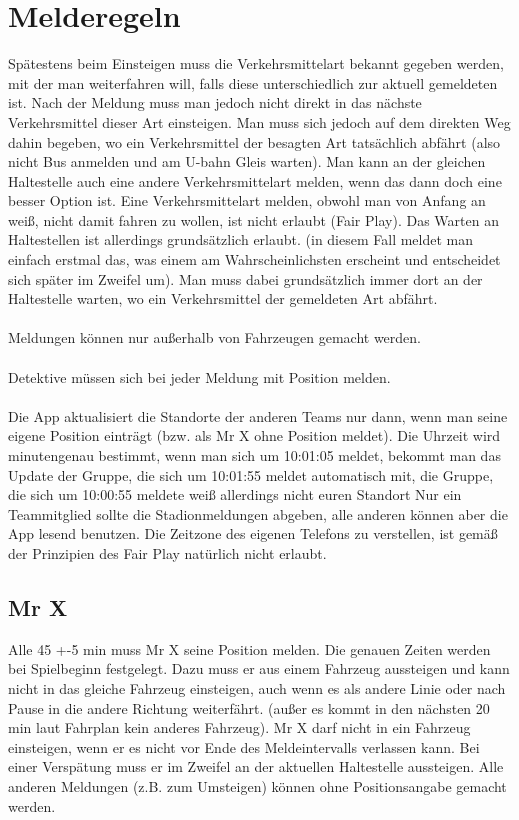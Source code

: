 \documentclass[12pt,a4paper]{article}
\begin{document}
\section{Melderegeln}
Spätestens beim Einsteigen muss die Verkehrsmittelart bekannt gegeben werden, mit der man weiterfahren will, falls diese unterschiedlich zur aktuell gemeldeten ist.
Nach der Meldung muss man jedoch nicht direkt in das nächste Verkehrsmittel dieser Art einsteigen.
Man muss sich jedoch auf dem direkten Weg dahin begeben, wo ein Verkehrsmittel der besagten Art tatsächlich abfährt
(also nicht Bus anmelden und am U-bahn Gleis warten).
Man kann an der gleichen Haltestelle auch eine andere Verkehrsmittelart melden, wenn das dann doch eine besser Option ist.
Eine Verkehrsmittelart melden, obwohl man von Anfang an weiß, nicht damit fahren zu wollen, ist nicht erlaubt (Fair Play).
Das Warten an Haltestellen ist allerdings grundsätzlich erlaubt. (in diesem Fall meldet man einfach erstmal das, was einem am Wahrscheinlichsten erscheint und entscheidet sich später im Zweifel um).
Man muss dabei grundsätzlich immer dort an der Haltestelle warten, wo ein Verkehrsmittel der gemeldeten Art abfährt.
\\
\\
Meldungen können nur außerhalb von Fahrzeugen gemacht werden.\\
\\
Detektive müssen sich bei jeder Meldung mit Position melden.\\
\\
Die App aktualisiert die Standorte der anderen Teams nur dann, wenn man seine eigene Position einträgt (bzw. als Mr X ohne Position meldet).
Die Uhrzeit wird minutengenau bestimmt, wenn man sich um 10:01:05 meldet, bekommt man das Update der Gruppe, die sich um 10:01:55 meldet automatisch mit, die Gruppe, die sich um 10:00:55 meldete weiß allerdings nicht euren Standort
Nur ein Teammitglied sollte die Stadionmeldungen abgeben, alle anderen können aber die App lesend benutzen.
Die Zeitzone des eigenen Telefons zu verstellen, ist gemäß der Prinzipien des Fair Play natürlich nicht erlaubt.

\subsection{Mr X}
Alle 45 +-5 min muss Mr X seine Position melden.
Die genauen Zeiten werden bei Spielbeginn festgelegt.
Dazu muss er aus einem Fahrzeug aussteigen und kann nicht in das gleiche Fahrzeug einsteigen, auch wenn es als andere Linie oder nach Pause in die andere Richtung weiterfährt. (außer es kommt in den nächsten 20 min laut Fahrplan kein anderes Fahrzeug).
Mr X darf nicht in ein Fahrzeug einsteigen, wenn er es nicht vor Ende des Meldeintervalls verlassen kann.
Bei einer Verspätung muss er im Zweifel an der aktuellen Haltestelle aussteigen.
Alle anderen Meldungen (z.B. zum Umsteigen) können ohne Positionsangabe gemacht werden.
\end{document}
